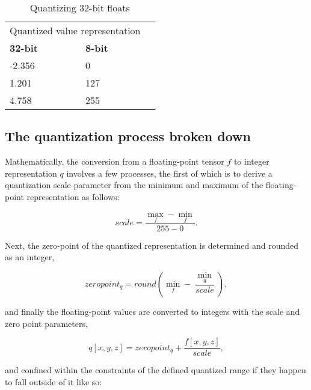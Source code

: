 \begin{table}[]
\centering
\caption{Quantizing 32-bit floats}
\label{tbl:quantize}
\begin{tabular}{|l|l|l}
\cline{1-2}
\multicolumn{2}{|l|}{Quantized value representation} &  \\ \cline{1-2}
\textbf{32-bit}           & \textbf{8-bit}           &  \\ \cline{1-2}
-2.356                    & 0                        &  \\ \cline{1-2}
1.201                     & 127                      &  \\ \cline{1-2}
4.758                     & 255                      &  \\ \cline{1-2}
\end{tabular}
\end{table}

\subsection{The quantization process broken down}
\label{sec:quantization}
Mathematically, the conversion from a floating-point tensor $f$ to integer representation $q$ involves a few processes, the first of which is to derive a quantization scale parameter from the minimum and maximum of the floating-point representation as follows:

\begin{equation}
\label{eqn:scale}
scale = \frac{\max_{f} - \min_{f}}{255 - 0}.
\end{equation}

Next, the zero-point of the quantized representation is determined and rounded as an integer,

\begin{equation}
\label{eqn:zero}
zero point_{q} = round(\min_{f} - \frac{\min_{q}}{scale}),
\end{equation}

and finally the floating-point values are converted to integers with the scale and zero point parameters,

\begin{equation}
\label{eqn:convert}
q[x,y,z] = zero point_{q} + \frac{f[x,y,z]}{scale},
\end{equation}

and confined within the constraints of the defined quantized range if they happen to fall outside of it \cite{gemmlowp} like so:

